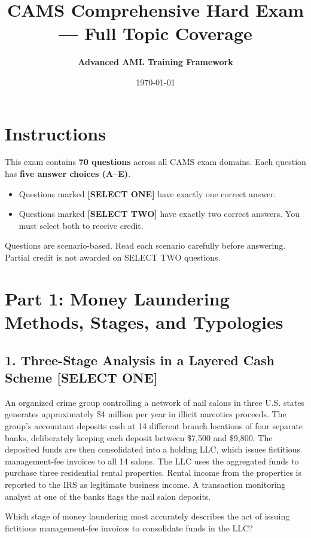 \documentclass[11pt,a4paper]{article}
\title{\textbf{CAMS Comprehensive Hard Exam --- Full Topic Coverage}}
\author{\textbf{Advanced AML Training Framework}}
\date{\today}
\begin{document}
	
	\maketitle
	
	\section*{Instructions}
	This exam contains \textbf{70 questions} across all CAMS exam domains. Each question has \textbf{five answer choices (A--E)}.
	\begin{itemize}
		\item Questions marked \textbf{[SELECT ONE]} have exactly one correct answer.
		\item Questions marked \textbf{[SELECT TWO]} have exactly two correct answers. You must select both to receive credit.
	\end{itemize}
	Questions are scenario-based. Read each scenario carefully before answering. Partial credit is not awarded on SELECT TWO questions.
	
	\newpage
	\section{Part 1: Money Laundering Methods, Stages, and Typologies}
	
	\subsection{1. Three-Stage Analysis in a Layered Cash Scheme \textnormal{[SELECT ONE]}}
	
	An organized crime group controlling a network of nail salons in three U.S. states generates approximately \$4 million per year in illicit narcotics proceeds. The group's accountant deposits cash at 14 different branch locations of four separate banks, deliberately keeping each deposit between \$7,500 and \$9,800. The deposited funds are then consolidated into a holding LLC, which issues fictitious management-fee invoices to all 14 salons. The LLC uses the aggregated funds to purchase three residential rental properties. Rental income from the properties is reported to the IRS as legitimate business income. A transaction monitoring analyst at one of the banks flags the nail salon deposits.
	
	Which stage of money laundering most accurately describes the act of issuing fictitious management-fee invoices to consolidate funds in the LLC?
	
\end{document}
